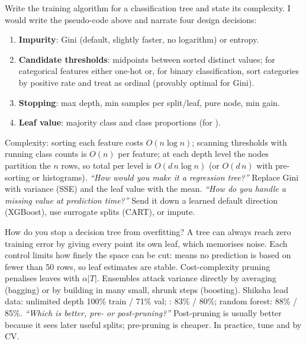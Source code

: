 \begin{qa}{ Write the training algorithm for a classification tree and
state its complexity.}
\why I would write the pseudo-code above and narrate four design decisions:
\begin{enumerate}
\item \textbf{Impurity}: Gini (default, slightly faster, no logarithm) or entropy.
\item \textbf{Candidate thresholds}: midpoints between sorted distinct values; for categorical features either one-hot
  or, for binary classification, sort categories by positive rate and treat as ordinal (provably optimal for Gini).
\item \textbf{Stopping}: max depth, min samples per split/leaf, pure node, min gain.
\item \textbf{Leaf value}: majority class and class proportions (for ).
\end{enumerate}
Complexity: sorting each feature costs $O(n\log n)$; scanning thresholds with running class counts is $O(n)$ per feature;
at each depth level the nodes partition the $n$ rows, so total per level is $O(d\,n\log n)$ (or $O(d\,n)$ with pre-sorting
or histograms).
\pushes \emph{``How would you make it a regression tree?''} Replace Gini with variance (SSE) and the leaf value with the mean.
\emph{``How do you handle a missing value at prediction time?''} Send it down a learned default direction (XGBoost), use
surrogate splits (CART), or impute.
\end{qa}

\begin{qa}{ How do you stop a decision tree from overfitting?}
\why A tree can always reach zero training error by giving every point its own leaf, which memorises noise. Each control limits
how finely the space can be cut:  means no prediction is based on fewer than 50 rows, so
leaf estimates are stable. Cost-complexity pruning penalises leaves with $\alpha|T|$. Ensembles attack variance directly by
averaging (bagging) or by building in many small, shrunk steps (boosting).
\worked Shiksha lead data: unlimited depth 100\% train / 71\% val; : 83\% / 80\%;
random forest: 88\% / 85\%.
\pushes \emph{``Which is better, pre- or post-pruning?''} Post-pruning is usually better because it sees later useful splits;
pre-pruning is cheaper. In practice, tune  and  by CV.
\end{qa}


